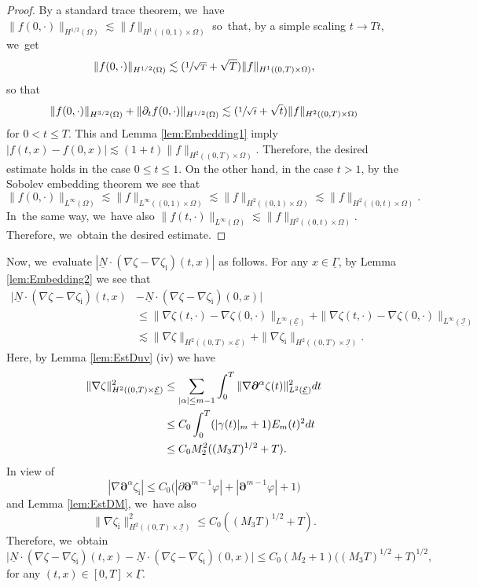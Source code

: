 \documentclass[11pt]{article}
\newcommand{\dt}{\partial_t}
\newcommand{\cI}{{\mathcal I}}
\newcommand{\cE}{{\mathcal E}}
\newcommand{\ul}[1]{\underline{#1}}
\newcommand{\itGamma}{\mathit{\Gamma}}
\theoremstyle{definition}
\begin{document}
\begin{proof}
By a standard trace theorem, we~have $\|f(0,\cdot)\|_{H^{1/2}(\Omega)} \lesssim \|f\|_{H^1((0,1)\times\Omega)}$ so~that, by a simple scaling $t\to Tt$, we~get
\[
\|f(0,\cdot)\|_{H^{1/2}(\Omega)} \lesssim (\sfrac{1}{\sqrt{T}}+\sqrt{T})\|f\|_{H^1((0,T)\times\Omega)},
\]
so that
\[
\|f(0,\cdot)\|_{H^{3/2}(\Omega)} + \|\dt f(0,\cdot)\|_{H^{1/2}(\Omega)} \lesssim (\sfrac{1}{\sqrt{t}}+\sqrt{t})\|f\|_{H^2((0,T)\times\Omega)}
\]
for $0<t\leq T$.
This and Lemma \ref{lem:Embedding1} imply $|f(t,x)-f(0,x)|\lesssim (1+t) \|f\|_{H^2((0,T)\times\Omega)}$.
Therefore, the desired estimate holds in the case $0\leq t\leq1$.
On the other hand, in the case $t>1$, by the Sobolev embedding theorem we see that
\[
\|f(0,\cdot)\|_{L^\infty(\Omega)} \lesssim \|f\|_{L^\infty((0,1)\times\Omega)} \lesssim \|f\|_{H^2((0,1)\times\Omega)} \lesssim \|f\|_{H^2((0,t)\times\Omega)}.
\]
In~the same way, we~have also $\|f(t,\cdot)\|_{L^\infty(\Omega)}\lesssim \|f\|_{H^2((0,t)\times\Omega)}$.
Therefore, we~obtain the desired estimate.
\end{proof}

Now, we~evaluate $|\ul{N}\cdot(\nabla\zeta-\nabla\zeta_\mathrm{i})(t,x)|$ as follows.
For any $x\in\ul{\itGamma}$, by Lemma \ref{lem:Embedding2} we see that
\begin{align*}
\bigl|\ul{N}\cdot(\nabla\zeta-\nabla\zeta_\mathrm{i})(t,x)&-\ul{N}\cdot(\nabla\zeta-\nabla\zeta_\mathrm{i})(0,x)\bigr| \\
&\leq \|\nabla\zeta(t,\cdot)-\nabla\zeta(0,\cdot)\|_{L^\infty(\ul{\cE})} + \|\nabla\zeta(t,\cdot)-\nabla\zeta(0,\cdot)\|_{L^\infty(\ul{\cI})} \\
&\lesssim \|\nabla\zeta\|_{H^2((0,T)\times\ul{\cE})} + \|\nabla\zeta_\mathrm{i}\|_{H^2((0,T)\times\ul{\cI})}.
\end{align*}
Here, by Lemma \ref{lem:EstDuv} (iv) we have
\begin{align*}
\|\nabla\zeta\|_{H^2((0,T)\times\ul{\cE})}^2
&\leq \sum_{|\alpha|\leq m-1}\int_0^T\|\nabla\bm{\partial}^\alpha\zeta(t)\|_{L^2(\ul{\cE})}^2 {\rm d}t \\
&\leq C_0\int_0^T(|\gamma(t)|_m+1)E_m(t)^2 {\rm d}t \\
&\leq C_0M_2^2((M_3T)^{1/2}+T).
\end{align*}
In view of
\[
|\nabla\bm{\partial}^\alpha\zeta_\mathrm{i}| \leq C_0\bigl(|\partial\bm{\partial}^{m-1}\varphi|+|\bm{\partial}^{m-1}\varphi|+1\bigr)
\]
and Lemma \ref{lem:EstDM}, we~have also
\[
\|\nabla\zeta_\mathrm{i}\|_{H^2((0,T)\times\ul{\cI})}^2 \leq C_0((M_3T)^{1/2}+T).
\]
Therefore, we~obtain
\begin{equation}\label{TransCond2}
\bigl|\ul{N}\cdot(\nabla\zeta-\nabla\zeta_\mathrm{i})(t,x)-\ul{N}\cdot(\nabla\zeta-\nabla\zeta_\mathrm{i})(0,x)\bigr|
\leq C_0(M_2+1)\bigl((M_3T)^{1/2}+T\bigr)^{1/2},
\end{equation}
for any $(t,x)\in[0,T]\times\ul{\itGamma}$.
\end{document}
